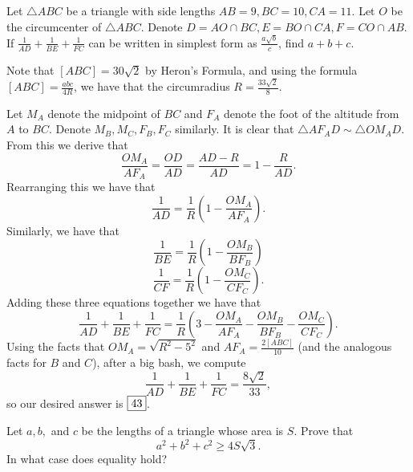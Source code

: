 \documentclass[letterpaper,oneside]{scrartcl}
\begin{document}
\begin{problem*}
  Let $\triangle ABC$ be a triangle with side lengths $AB = 9, BC = 10, CA = 11$. Let $O$ be the circumcenter of $\triangle ABC$. Denote $D = AO \cap BC, E = BO \cap CA, F = CO \cap AB$. If $\tfrac{1}{AD} + \tfrac{1}{BE} + \tfrac{1}{FC}$ can be written in simplest form as $\tfrac{a \sqrt{b}}{c}$, find $a + b + c$.
\end{problem*}
\begin{soln}
  Note that \([ABC] = 30\sqrt2\) by Heron's Formula, and using the formula \([ABC] = \frac{abc}{4R}\), we have that the circumradius \(R = \frac{33\sqrt2}{8}\).

  Let \(M_A\) denote the midpoint of \(BC\) and \(F_A\) denote the foot of the altitude from \(A\) to \(BC\). Denote \(M_B, M_C, F_B, F_C\) similarly. It is clear that \(\triangle AF_AD \sim \triangle OM_AD.\) From this we derive that
  \[\frac{OM_A}{AF_A} = \frac{OD}{AD} = \frac{AD-R}{AD} = 1 - \frac{R}{AD}.\] Rearranging this we have that
  \[\frac{1}{AD} = \frac{1}{R}\left(1 - \frac{OM_A}{AF_A}\right).\]
  Similarly, we have that
  \[\frac{1}{BE} = \frac{1}{R}\left(1 - \frac{OM_B}{BF_B}\right)\]
  \[\frac{1}{CF} = \frac{1}{R}\left(1 - \frac{OM_C}{CF_C}\right).\]
  Adding these three equations together we have that
  \[\frac{1}{AD} + \frac{1}{BE} + \frac{1}{FC} = \frac{1}{R}\left(3 - \frac{OM_A}{AF_A} - \frac{OM_B}{BF_B} - \frac{OM_C}{CF_C}\right).\]
  Using the facts that \(OM_A = \sqrt{R^2 - 5^2}\) and \(AF_A = \frac{2[ABC]}{10}\) (and the analogous facts for \(B\) and \(C\)), after a big bash, we compute
  \[\frac{1}{AD} + \frac{1}{BE} + \frac{1}{FC}  = \frac{8\sqrt2}{33},\]
  so our desired answer is \(\fbox{43}\).
\end{soln}
\newpage
\begin{problem*}
  [IMO 1961/2]
  Let \(a,b,\) and \(c\) be the lengths of a triangle whose area is \(S\). Prove that \[a^2 + b^2 + c^2 \ge 4S\sqrt{3}.\] In what case does equality hold?
\end{problem*}
\end{document}
